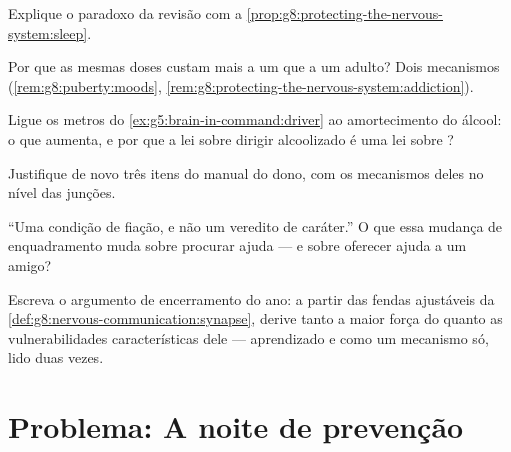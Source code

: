 \begin{exercise}[$\star\star$]\label{exo:g8:protecting-the-nervous-system:7}
Explique o paradoxo da revisão com a
\cref{prop:g8:protecting-the-nervous-system:sleep}.
\end{exercise}

\begin{exercise}[$\star\star$]\label{exo:g8:protecting-the-nervous-system:8}
Por que as mesmas doses custam mais a um   que a um
adulto? Dois mecanismos (\cref{rem:g8:puberty:moods},
\cref{rem:g8:protecting-the-nervous-system:addiction}).
\end{exercise}

\begin{exercise}[$\star\star$]\label{exo:g8:protecting-the-nervous-system:9}
Ligue os metros do \cref{ex:g5:brain-in-command:driver} ao
amortecimento do álcool: o que aumenta, e por que a lei sobre dirigir
alcoolizado é uma lei sobre ?
\end{exercise}

\begin{exercise}[$\star\star$]\label{exo:g8:protecting-the-nervous-system:10}
Justifique de novo três itens do manual do dono, com os mecanismos
deles no nível das junções.
\end{exercise}

\begin{exercise}[$\star\star$]\label{exo:g8:protecting-the-nervous-system:11}
``Uma condição de fiação, e não um veredito de caráter.'' O que essa
mudança de enquadramento muda sobre procurar ajuda --- e sobre oferecer
ajuda a um amigo?
\end{exercise}

\begin{exercise}[$\star\star\star$]\label{exo:g8:protecting-the-nervous-system:12}
Escreva o argumento de encerramento do ano: a partir das fendas
ajustáveis da \cref{def:g8:nervous-communication:synapse}, derive tanto
a maior força do  quanto as vulnerabilidades características
dele --- aprendizado e  como um mecanismo só, lido duas
vezes.
\end{exercise}

\section{Problema: A noite de prevenção}

